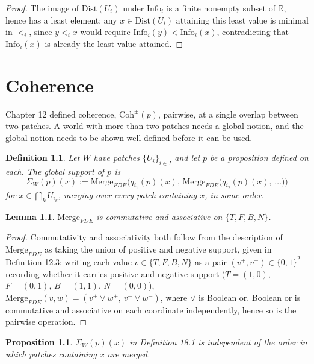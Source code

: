 \documentclass[11pt]{book}
\newtheorem{definition}[theorem]{Definition}
\newtheorem{lemma}[theorem]{Lemma}
\newtheorem{proposition}[theorem]{Proposition}
\begin{document}
\begin{proof}
The image of $\mathrm{Dist}(U_i)$ under $\mathrm{Info}_i$ is a finite nonempty subset of $\mathbb R$, hence has a least element; any $x \in \mathrm{Dist}(U_i)$ attaining this least value is minimal in $<_i$, since $y <_i x$ would require $\mathrm{Info}_i(y) < \mathrm{Info}_i(x)$, contradicting that $\mathrm{Info}_i(x)$ is already the least value attained.
\end{proof}

\chapter{Coherence}

Chapter 12 defined coherence, $\mathrm{Coh}^\pm(p)$, pairwise, at a single overlap between two patches. A world with more than two patches needs a global notion, and the global notion needs to be shown well-defined before it can be used.

\begin{definition}
Let $W$ have patches $\{U_i\}_{i \in I}$ and let $p$ be a proposition defined on each. The \emph{global support} of $p$ is
\[
\Sigma_W(p)(x) := \mathrm{Merge}_{FDE}\big( q_{i_1}(p)(x), \, \mathrm{Merge}_{FDE}\big( q_{i_2}(p)(x), \, \dots \big) \big)
\]
for $x \in \bigcap_k U_{i_k}$, merging over every patch containing $x$, in some order.
\end{definition}

\begin{lemma}
$\mathrm{Merge}_{FDE}$ is commutative and associative on $\{T, F, B, N\}$.
\end{lemma}

\begin{proof}
Commutativity and associativity both follow from the description of $\mathrm{Merge}_{FDE}$ as taking the union of positive and negative support, given in Definition 12.3: writing each value $v \in \{T,F,B,N\}$ as a pair $(v^+, v^-) \in \{0,1\}^2$ recording whether it carries positive and negative support ($T = (1,0)$, $F = (0,1)$, $B = (1,1)$, $N = (0,0)$), $\mathrm{Merge}_{FDE}(v, w) = (v^+ \vee w^+, \, v^- \vee w^-)$, where $\vee$ is Boolean or. Boolean or is commutative and associative on each coordinate independently, hence so is the pairwise operation.
\end{proof}

\begin{proposition}
$\Sigma_W(p)(x)$ in Definition 18.1 is independent of the order in which patches containing $x$ are merged.
\end{proposition}
\end{document}
